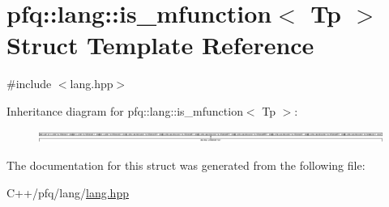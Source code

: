 \hypertarget{structpfq_1_1lang_1_1is__mfunction}{\section{pfq\+:\+:lang\+:\+:is\+\_\+mfunction$<$ Tp $>$ Struct Template Reference}
\label{structpfq_1_1lang_1_1is__mfunction}
}


{\ttfamily \#include $<$lang.\+hpp$>$}

Inheritance diagram for pfq\+:\+:lang\+:\+:is\+\_\+mfunction$<$ Tp $>$\+:\begin{figure}[H]
\begin{center}
\leavevmode
\includegraphics[height=0.381992cm]{structpfq_1_1lang_1_1is__mfunction}
\end{center}
\end{figure}


The documentation for this struct was generated from the following file\+:\begin{DoxyCompactItemize}
\item 
C++/pfq/lang/\hyperlink{lang_8hpp}{lang.\+hpp}\end{DoxyCompactItemize}
